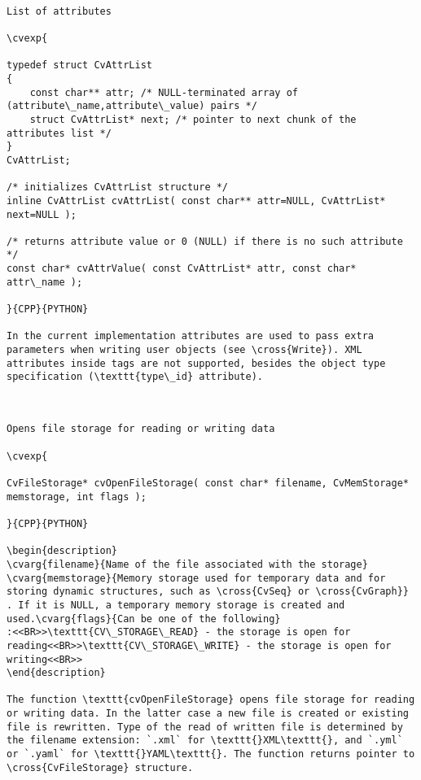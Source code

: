 \begin{verbatim}

List of attributes

\cvexp{

typedef struct CvAttrList
{
    const char** attr; /* NULL-terminated array of (attribute\_name,attribute\_value) pairs */
    struct CvAttrList* next; /* pointer to next chunk of the attributes list */
}
CvAttrList;

/* initializes CvAttrList structure */
inline CvAttrList cvAttrList( const char** attr=NULL, CvAttrList* next=NULL );

/* returns attribute value or 0 (NULL) if there is no such attribute */
const char* cvAttrValue( const CvAttrList* attr, const char* attr\_name );

}{CPP}{PYTHON}

In the current implementation attributes are used to pass extra parameters when writing user objects (see \cross{Write}). XML attributes inside tags are not supported, besides the object type specification (\texttt{type\_id} attribute).


\end{verbatim}
\begin{verbatim}

Opens file storage for reading or writing data

\cvexp{

CvFileStorage* cvOpenFileStorage( const char* filename, CvMemStorage* memstorage, int flags );

}{CPP}{PYTHON}

\begin{description}
\cvarg{filename}{Name of the file associated with the storage}
\cvarg{memstorage}{Memory storage used for temporary data and for storing dynamic structures, such as \cross{CvSeq} or \cross{CvGraph}}
. If it is NULL, a temporary memory storage is created and used.\cvarg{flags}{Can be one of the following}
:<<BR>>\texttt{CV\_STORAGE\_READ} - the storage is open for reading<<BR>>\texttt{CV\_STORAGE\_WRITE} - the storage is open for writing<<BR>>
\end{description}

The function \texttt{cvOpenFileStorage} opens file storage for reading or writing data. In the latter case a new file is created or existing file is rewritten. Type of the read of written file is determined by the filename extension: `.xml` for \texttt{}XML\texttt{}, and `.yml` or `.yaml` for \texttt{}YAML\texttt{}. The function returns pointer to \cross{CvFileStorage} structure.


\end{verbatim}
